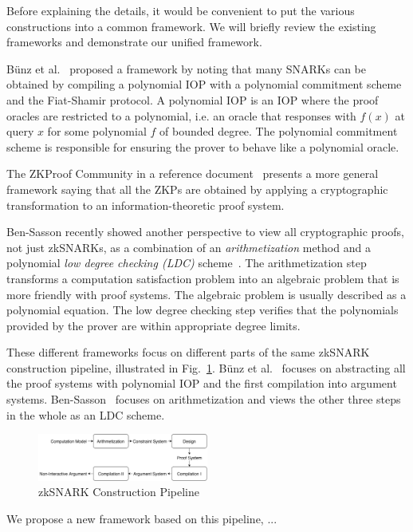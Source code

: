\documentclass[acmtog]{acmart}
\begin{document}
Before explaining the details, it would be convenient to put the various constructions into a common framework.
We will briefly review the existing frameworks and demonstrate our unified framework.

B\"{u}nz et al.~\cite{BunzFS20} proposed a framework by noting that many SNARKs can be obtained by compiling a polynomial IOP with a polynomial commitment scheme and the Fiat-Shamir protocol.
A polynomial IOP is an IOP where the proof oracles are restricted to a polynomial, i.e. an oracle that responses with $f(x)$ at query $x$ for some polynomial $f$ of bounded degree.
The polynomial commitment scheme is responsible for ensuring the prover to behave like a polynomial oracle.

The ZKProof Community in a reference document~\cite{ZKProof20} presents a more general framework saying that all the ZKPs are obtained by applying a cryptographic transformation to an information-theoretic proof system.

Ben-Sasson recently showed another perspective to view all cryptographic proofs, not just zkSNARKs, as a combination of an \emph{arithmetization} method and a polynomial \emph{low degree checking (LDC)} scheme~\cite{Ben-Sasson2020}.
The arithmetization step transforms a computation satisfaction problem into an algebraic problem that is more friendly with proof systems.
The algebraic problem is usually described as a polynomial equation.
The low degree checking step verifies that the polynomials provided by the prover are within appropriate degree limits.

These different frameworks focus on different parts of the same zkSNARK construction pipeline, illustrated in Fig.~\ref{fig:pipeline}.
B\"{u}nz et al.~\cite{BunzFS20} focuses on abstracting all the proof systems with polynomial IOP and the first compilation into argument systems.
Ben-Sasson~\cite{Ben-Sasson2020} focuses on arithmetization and views the other three steps in the whole as an LDC scheme.

\begin{figure}[ht!]
\includegraphics[width=0.5\textwidth]{images/pipeline.pdf}
\caption{zkSNARK Construction Pipeline}
\label{fig:pipeline}
\Description{}
\end{figure}

We propose a new framework based on this pipeline, ...
\end{document}
